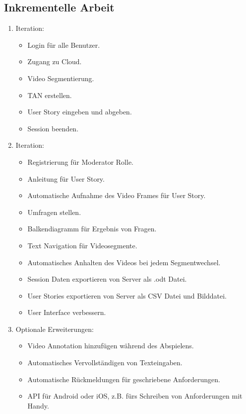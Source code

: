 	\subsection{Inkrementelle Arbeit}
		\begin{enumerate}
			\item Iteration:
			\begin{itemize}
				\item Login für alle Benutzer.
				\item Zugang zu Cloud.
				\item Video Segmentierung.
				\item TAN erstellen.
				\item User Story eingeben und abgeben.
				\item Session beenden.
			\end{itemize}
			\item Iteration:
			\begin{itemize}
				\item Registrierung für Moderator Rolle.
				\item Anleitung für User Story.
				\item Automatische Aufnahme des Video Frames für User Story.
				\item Umfragen stellen.
				\item Balkendiagramm für Ergebnis von Fragen.
				\item Text Navigation für Videosegmente.
				\item Automatisches Anhalten des Videos bei jedem Segmentwechsel.
				\item Session Daten exportieren von Server als .odt Datei.
				\item User Stories exportieren von Server als CSV Datei und Bilddatei.
				\item User Interface verbessern.
			\end{itemize}
			\item Optionale Erweiterungen:
			\begin{itemize}
				\item Video Annotation hinzufügen während des Abspielens.
				\item Automatisches Vervollständigen von Texteingaben.
				\item Automatische Rückmeldungen für geschriebene Anforderungen.
				\item API für Android oder iOS, z.B. fürs Schreiben von Anforderungen mit Handy.
			\end{itemize}
		\end{enumerate}


		